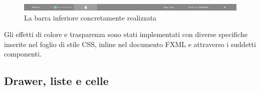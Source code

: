             \begin{figure}[htbp]
                \centering
                \includegraphics[scale=0.45]{img/NewBar}
                \caption{La barra inferiore concretamente realizzata}
                \label{fig:newBar}
            \end{figure}

            Gli effetti di colore e trasparenza sono stati implementati con diverse specifiche inserite nel foglio di stile CSS, inline nel documento FXML e attraverso i suddetti componenti.

        \subsection{Drawer, liste e celle}\label{sub:drawerCelle}
